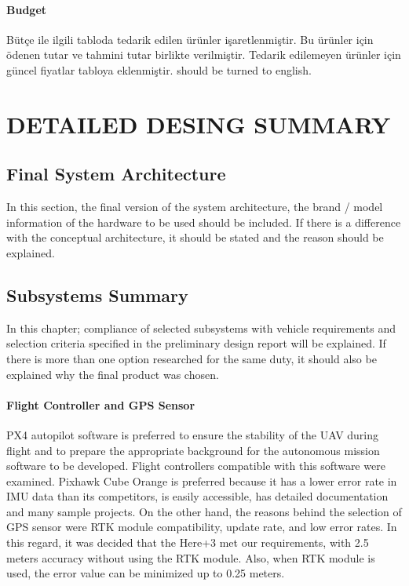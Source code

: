 \documentclass[12pt]{article}
\begin{document}
\paragraph*{Budget} Bütçe ile ilgili tabloda tedarik edilen ürünler işaretlenmiştir. Bu ürünler için ödenen tutar ve tahmini tutar birlikte verilmiştir. Tedarik edilemeyen ürünler için güncel fiyatlar tabloya eklenmiştir. 
should be turned to english.

\section{DETAILED DESING SUMMARY}
\subsection{Final System Architecture}
\justify
In this section, the final version of the system architecture, the brand / model information of the hardware to be used should be included. If there is a difference with the conceptual architecture, it should be stated and the reason should be explained.
\justify

\subsection{Subsystems Summary}
In this chapter; compliance of selected subsystems with vehicle requirements and selection criteria specified in the preliminary design report will be explained. If there is more than one option researched for the same duty, it should also be explained why the final product was chosen. 

\paragraph*{Flight Controller and GPS Sensor} PX4 autopilot software is preferred to ensure the stability of the UAV during flight and to prepare the appropriate background for the autonomous mission software to be developed. Flight controllers compatible with this software were examined. Pixhawk Cube Orange is preferred because it has a lower error rate in IMU data than its competitors, is easily accessible, has detailed documentation and many sample projects. On the other hand, the reasons behind the selection of GPS sensor were RTK module compatibility, update rate, and low error rates. In this regard, it was decided that the Here+3 met our requirements, with 2.5 meters accuracy without using the RTK module. Also, when RTK module is used, the error value can be minimized up to 0.25 meters. 
\end{document}

